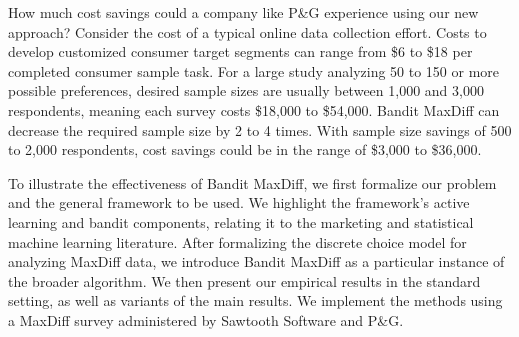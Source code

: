 \documentclass[nonblindrev]{informs3}
\newcommand{\eric}[1]{\textcolor{red}{\textbf{(eric)} #1}}
\begin{document}
How much cost savings could a company like P\&G experience using our new approach? Consider the cost of a typical online data collection effort. Costs to develop customized consumer target segments can range from \$6 to \$18 per completed consumer sample task. For a large study analyzing 50 to 150 or more possible preferences, desired sample sizes are usually between 1,000 and 3,000 respondents, meaning each survey costs \$18,000 to \$54,000. Bandit MaxDiff can decrease the required sample size by 2 to 4 times. With sample size savings of 500 to 2,000 respondents, cost savings could be in the range of \$3,000 to \$36,000.

To illustrate the effectiveness of Bandit MaxDiff, we first formalize our problem and the general framework to be used. We highlight the framework's active learning and bandit components, relating it to the marketing and statistical machine learning literature. After formalizing the discrete choice model for analyzing MaxDiff data, we introduce Bandit MaxDiff as a particular instance of the broader algorithm. We then present our empirical results in the standard setting, as well as variants of the main results. We implement the methods using a MaxDiff survey administered by Sawtooth Software and P\&G. 











\end{document}
